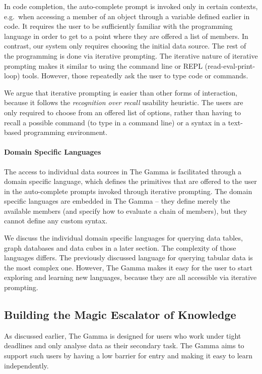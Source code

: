 \documentclass[manuscript,review,anonymous]{acmart}
\begin{document}
In code completion, the auto-complete
prompt is invoked only in certain contexts, e.g.~when accessing a member of an object through a
variable defined earlier in code. It requires the user to be sufficiently familiar with the
programming language in order to get to a point where they are offered a list of members. In
contrast, our system only requires choosing the initial data source. The rest of the programming
is done via iterative prompting. The iterative nature of iterative prompting makes it similar to
using the command line or REPL (read-eval-print-loop) tools. However, those repeatedly ask the
user to type code or commands.

We argue that iterative prompting is easier than other forms of interaction, because it
follows the \emph{recognition over recall} usability heuristic. The users are only required to
choose from an offered list of options, rather than having to recall a possible command
(to type in a command line) or a syntax in a text-based programming environment.

\paragraph{Domain Specific Languages}
The access to individual data sources in The Gamma is facilitated through a domain specific
language, which defines the primitives that are offered to the user in the auto-complete prompts
invoked through iterative prompting. The domain specific languages are embedded in The Gamma --
they define merely the available members (and specify how to evaluate a chain of members), but
they cannot define any custom syntax.

We discuss the individual domain specific languages for querying data tables, graph databases and
data cubes in a later section. The complexity of those languages differs. The previously discussed
language for querying tabular data is the most complex one. However, The Gamma makes it easy for
the user to start exploring and learning new languages, because they are all accessible via
iterative prompting.

\subsection{Building the Magic Escalator of Knowledge}
As discussed earlier, The Gamma is designed for users who work under tight deadlines and only
analyse data as their secondary task. The Gamma aims to support such users by having a low
barrier for entry and making it easy to learn independently.
\end{document}
